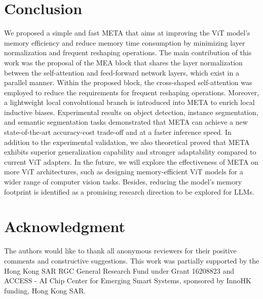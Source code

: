 \section{Conclusion}
We proposed a simple and fast META that aims at improving the ViT model's memory efficiency and reduce memory time consumption by minimizing layer normalization and frequent reshaping operations. The main contribution of this work was the proposal of the MEA block that shares the {layer normalization} between the self-attention and feed-forward network layers, which exist in a parallel manner. Within the proposed block, the cross-shaped self-attention was employed to reduce the requirements for frequent {reshaping operations}. Moreover, a lightweight local convolutional branch is introduced into META to enrich local inductive biases. 
%
Experimental results on object detection, instance segmentation, and semantic segmentation tasks demonstrated that META can achieve a new state-of-the-art accuracy-cost trade-off and at a faster inference speed. In addition to the experimental validation, we also theoretical proved that META exhibits superior generalization capability and stronger adaptability compared to current ViT adapters. In the future, we will explore the effectiveness of META on more ViT architectures, such as designing memory-efficient ViT models for a wider range of computer vision tasks. Besides, reducing the model's memory footprint is identified as a promising research direction to be explored for LLMs. 

\section*{Acknowledgment}
The authors would like to thank all anonymous reviewers for their positive comments and constructive suggestions. This work was partially supported by the Hong Kong SAR RGC General Research Fund under Grant 16208823 and ACCESS - AI Chip Center for Emerging Smart Systems, sponsored by InnoHK funding, Hong Kong SAR.
